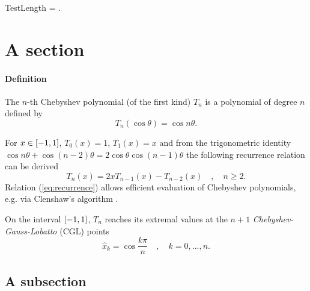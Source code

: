 \newlength\TestLength
\setlength{\TestLength}{0pt}
\begin{figure}[htp]
  \centering
\end{figure}
TestLength = \the\TestLength.

\section{A section}

\paragraph*{Definition}
The $n$-th Chebyshev polynomial (of the first kind) $T_n$ is a polynomial of degree $n$ defined by
\begin{equation*}
	T_n \left(\cos \theta \right) = \cos n \theta.
    \label{def_cos}
\end{equation*}

For $x \in \left[ -1, 1 \right]$, $T_0(x) = 1$, $T_1(x) = x$ and from the trigonometric identity $\cos n\theta + \cos (n-2)\theta = 2\cos \theta \cos (n-1)\theta $ the following recurrence relation can be derived
\begin{equation}
	T_{n}(x) = 2x T_{n-1}(x) - T_{n-2}(x) \quad, \quad n \geq 2.
    \label{eq:recurrence}
\end{equation}
Relation (\ref{eq:recurrence}) allows efficient evaluation of Chebyshev polynomials, e.g. via Clenshaw's algorithm \cite{clenshaw1955}. %
\par

On the interval $\left[ -1, 1 \right]$, $T_n$ reaches its extremal values at the $n+1$ \textit{Chebyshev-Gauss-Lobatto} (CGL) points
\begin{equation*}
	\hat{x}_k = \cos \frac{k \pi}{n} \quad, \quad k = 0,\ldots,n.
\end{equation*}
\subsection{A subsection}

